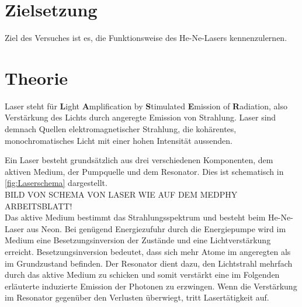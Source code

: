 \section{Zielsetzung}
\label{sec:Zielsetzung}
Ziel des Versuches ist es, die Funktionsweise des He-Ne-Lasers kennenzulernen.

\section{Theorie}
\label{sec:Theorie}

Laser steht für \textbf{L}ight \textbf{A}mplification by \textbf{S}timulated \textbf{E}mission of \textbf{R}adiation, also
Verstärkung des Lichts durch angeregte Emission von Strahlung.
Laser sind demnach Quellen elektromagnetischer Strahlung, die kohärentes, monochromatisches Licht mit einer hohen Intensität aussenden.


Ein Laser besteht grundsätzlich aus drei verschiedenen Komponenten, dem aktiven Medium, der Pumpquelle und dem Resonator.
Dies ist schematisch in \autoref{fig:Laserschema} dargestellt.\\

BILD VON SCHEMA VON LASER WIE AUF DEM MEDPHY ARBEITSBLATT!\\

Das aktive Medium bestimmt das Strahlungsspektrum und besteht beim He-Ne-Laser aus Neon.
Bei genügend Energiezufuhr durch die Energiepumpe wird im Medium eine Besetzungsinversion der Zustände und eine Lichtverstärkung erreicht.
Besetzungsinversion bedeutet, dass sich mehr Atome im angeregten als im Grundzustand befinden.
Der Resonator dient dazu, den Lichtstrahl mehrfach durch das aktive Medium zu schicken und somit verstärkt eine im Folgenden erläuterte
induzierte Emission der Photonen zu erzwingen.
Wenn die Verstärkung im Resonator gegenüber den Verlusten überwiegt, tritt Lasertätigkeit auf.\\

